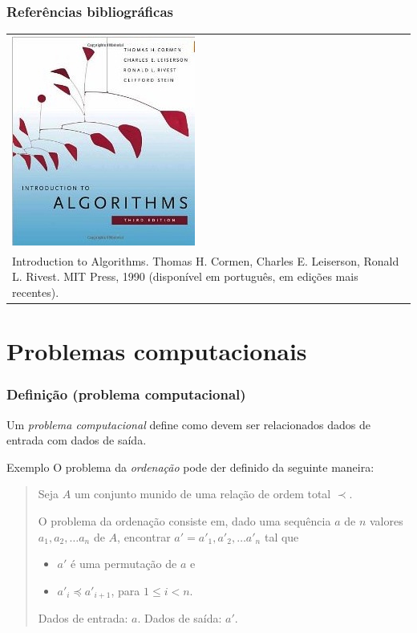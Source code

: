 \documentclass{beamer}
\begin{document}
\begin{frame}

  \frametitle{Referências bibliográficas}

  \begin{tabular}{p{}}
    \includegraphics[width=.35\textwidth]{img/cormen.jpg}
    \\
    Introduction to Algorithms. Thomas H. Cormen, Charles E. Leiserson, Ronald L. Rivest. MIT Press, 1990 (disponível em português, em edições mais recentes).
  \end{tabular}

\end{frame}

\section{Problemas computacionais}

\begin{frame}
  \frametitle{Definição (problema computacional)}

  Um \emph{problema computacional\/} define como devem ser relacionados dados de
  entrada com dados de saída.

  \begin{block}{Exemplo}
    O problema da \emph{ordenação} pode der definido da seguinte maneira:
    \begin{quote}
      Seja $A$ um conjunto munido de uma relação de ordem total $\prec$.

      O problema da ordenação consiste em, dado uma sequência $a$ de $n$ valores
      $a_1, a_2, \ldots a_n$ de $A$, encontrar $a' = a'_1, a'_2, \ldots a'_n$ tal
      que
      \begin{itemize}
      \item $a'$ é uma permutação de $a$ e
      \item $a'_i \preceq a'_{i+1}$, para $1 \le i < n$.
      \end{itemize}
      Dados de entrada: $a$. Dados de saída: $a'$.
    \end{quote}
    \end{block}
\end{frame}
\end{document}
